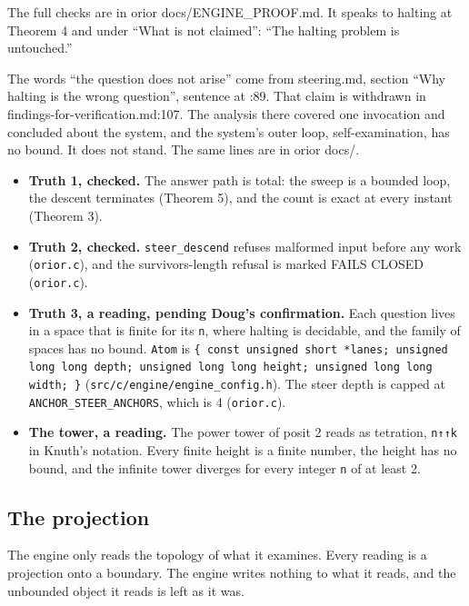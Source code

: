 The full checks are in orior docs/ENGINE\_\allowbreak{}PROOF.md. It speaks to halting at Theorem 4 and under “What is not claimed”: “The halting problem is untouched.”

The words “the question does not arise” come from steering.md, section “Why halting is the wrong question”, sentence at :89. That claim is withdrawn in findings-for-verification.md:107. The analysis there covered one invocation and concluded about the system, and the system's outer loop, self-examination, has no bound. It does not stand. The same lines are in orior docs/.

\begin{itemize}
\item \textbf{Truth 1, checked.} The answer path is total: the sweep is a bounded loop, the descent terminates (Theorem 5), and the count is exact at every instant (Theorem 3).
\item \textbf{Truth 2, checked.} \texttt{steer\_\allowbreak{}descend} refuses malformed input before any work (\texttt{orior.\allowbreak{}c}), and the survivors-length refusal is marked FAILS CLOSED (\texttt{orior.\allowbreak{}c}).
\item \textbf{Truth 3, a reading, pending Doug's confirmation.} Each question lives in a space that is finite for its \texttt{n}, where halting is decidable, and the family of spaces has no bound. \texttt{Atom} is \texttt{\{ const unsigned short *lanes; unsigned long long depth; unsigned long long height; unsigned long long width; \}} (\texttt{src/\allowbreak{}c/\allowbreak{}engine/\allowbreak{}engine\_\allowbreak{}config.\allowbreak{}h}). The steer depth is capped at \texttt{ANCHOR\_\allowbreak{}STEER\_\allowbreak{}ANCHORS}, which is 4 (\texttt{orior.\allowbreak{}c}).
\item \textbf{The tower, a reading.} The power tower of posit 2 reads as tetration, \texttt{n↑↑k} in Knuth's notation. Every finite height is a finite number, the height has no bound, and the infinite tower diverges for every integer \texttt{n} of at least 2.
\end{itemize}

\subsection{\texorpdfstring{The projection}{The projection}}

The engine only reads the topology of what it examines. Every reading is a projection onto a boundary. The engine writes nothing to what it reads, and the unbounded object it reads is left as it was.

